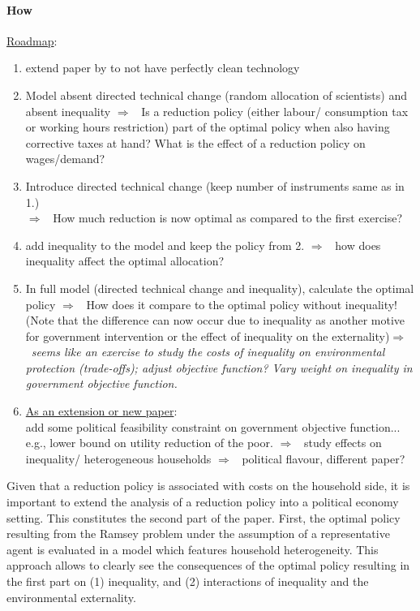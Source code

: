 \documentclass[12pt]{article}
\newcommand{\ar}{$\Rightarrow$ \ }
\begin{document}
\paragraph{How}
\underline{Roadmap}: 
\begin{enumerate}
	\item extend paper by \cite{Acemoglu2012TheChange} to not have perfectly clean technology
\item Model absent directed technical change (random allocation of scientists) and absent inequality \ar Is a reduction policy  (either labour/ consumption tax or working hours restriction) part of the optimal policy when also having corrective taxes at hand? What is the effect of a reduction policy on wages/demand? 
\item Introduce directed technical change (keep number of instruments same as in 1.) \\ \ar How much reduction is now optimal as compared to the first exercise?
\item add inequality to the model and keep the policy from 2. \ar how does inequality affect the optimal allocation?
\item In full model (directed technical change and inequality), calculate the optimal policy \ar How does it compare to the optimal policy without inequality! (Note that the difference can now occur due to inequality as another motive for government intervention or the effect of inequality on the externality)\ar \textit{seems like an exercise to study the costs of inequality on environmental protection (trade-offs); adjust objective function? Vary weight on inequality in government objective function. }

\item \underline{As an extension or new paper}: \\ add some political feasibility constraint on government objective function... e.g., lower bound on utility reduction of the poor. \ar study effects on inequality/ heterogeneous households \ar political flavour, different paper?
\end{enumerate}


Given that a reduction policy is associated with costs on the household side, it is important to extend the analysis of a reduction policy into a political economy setting. This constitutes the second part of the paper. 
First, the optimal policy resulting from the Ramsey problem under the assumption of a representative agent is evaluated in a model which features household heterogeneity. This approach allows to clearly see the consequences of the optimal policy resulting in the first part on (1) inequality, and (2) interactions of  inequality and the environmental externality. 
\end{document}
